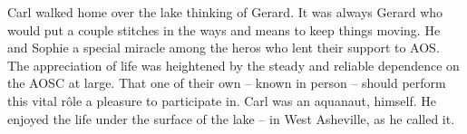 

Carl walked home over the lake thinking of Gerard.  It was always
Gerard who would put a couple stitches in the ways and means to keep
things moving.  He and Sophie a special miracle among the heros who
lent their support to AOS.  The appreciation of life was heightened by
the steady and reliable dependence on the AOSC at large.  That one of
their own -- known in person -- should perform this vital r\^ole a
pleasure to participate in.  Carl was an aquanaut, himself.  He
enjoyed the life under the surface of the lake -- in West Asheville,
as he called it.

\bye
